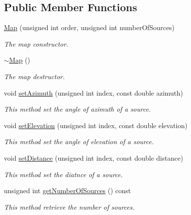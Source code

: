 \subsection*{Public Member Functions}
\begin{DoxyCompactItemize}
\item 
\hyperlink{class_hoa3_d_1_1_map_a442cdcc3ac651b716ae2617fa64c44b4}{Map} (unsigned int order, unsigned int number\-Of\-Sources)
\begin{DoxyCompactList}\small\item\em The map constructor. \end{DoxyCompactList}\item 
\hyperlink{class_hoa3_d_1_1_map_a89f5772a7f26cda206637dd1fca1c16e}{$\sim$\-Map} ()
\begin{DoxyCompactList}\small\item\em The map destructor. \end{DoxyCompactList}\item 
void \hyperlink{class_hoa3_d_1_1_map_a251f215d1e137e652d12fc8e811bd8c8}{set\-Azimuth} (unsigned int index, const double azimuth)
\begin{DoxyCompactList}\small\item\em This method set the angle of azimuth of a source. \end{DoxyCompactList}\item 
void \hyperlink{class_hoa3_d_1_1_map_a03262a011f73ed57ba40bb6fe6d50814}{set\-Elevation} (unsigned int index, const double elevation)
\begin{DoxyCompactList}\small\item\em This method set the angle of elevation of a source. \end{DoxyCompactList}\item 
void \hyperlink{class_hoa3_d_1_1_map_a61b55ea17301701fc02dffca46957330}{set\-Distance} (unsigned int index, const double distance)
\begin{DoxyCompactList}\small\item\em This method set the diatnce of a source. \end{DoxyCompactList}\item 
unsigned int \hyperlink{class_hoa3_d_1_1_map_a49c97eaf507f6ccc9c1e7eb8fbff0ac9}{get\-Number\-Of\-Sources} () const 
\begin{DoxyCompactList}\small\item\em This method retrieve the number of sources. \end{DoxyCompactList}\item 

\end{DoxyCompactItemize}

